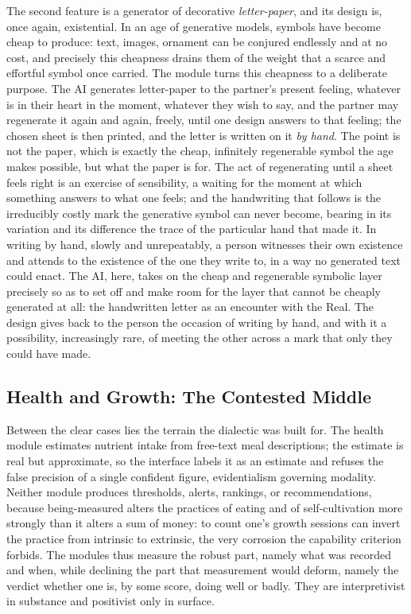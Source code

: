 \documentclass[11pt,a4paper]{article}
\begin{document}
The second feature is a generator of decorative \emph{letter-paper}, and its design is, once again, existential. In an age of generative models, symbols have become cheap to produce: text, images, ornament can be conjured endlessly and at no cost, and precisely this cheapness drains them of the weight that a scarce and effortful symbol once carried. The module turns this cheapness to a deliberate purpose. The AI generates letter-paper to the partner's present feeling, whatever is in their heart in the moment, whatever they wish to say, and the partner may regenerate it again and again, freely, until one design answers to that feeling; the chosen sheet is then printed, and the letter is written on it \emph{by hand}. The point is not the paper, which is exactly the cheap, infinitely regenerable symbol the age makes possible, but what the paper is for. The act of regenerating until a sheet feels right is an exercise of sensibility, a waiting for the moment at which something answers to what one feels; and the handwriting that follows is the irreducibly costly mark the generative symbol can never become, bearing in its variation and its difference the trace of the particular hand that made it. In writing by hand, slowly and unrepeatably, a person witnesses their own existence and attends to the existence of the one they write to, in a way no generated text could enact. The AI, here, takes on the cheap and regenerable symbolic layer precisely so as to set off and make room for the layer that cannot be cheaply generated at all: the handwritten letter as an encounter with the Real. The design gives back to the person the occasion of writing by hand, and with it a possibility, increasingly rare, of meeting the other across a mark that only they could have made.

\subsection{Health and Growth: The Contested Middle}

Between the clear cases lies the terrain the dialectic was built for. The health module estimates nutrient intake from free-text meal descriptions; the estimate is real but approximate, so the interface labels it as an estimate and refuses the false precision of a single confident figure, evidentialism governing modality. Neither module produces thresholds, alerts, rankings, or recommendations, because being-measured alters the practices of eating and of self-cultivation more strongly than it alters a sum of money: to count one's growth sessions can invert the practice from intrinsic to extrinsic, the very corrosion the capability criterion forbids. The modules thus measure the robust part, namely what was recorded and when, while declining the part that measurement would deform, namely the verdict whether one is, by some score, doing well or badly. They are interpretivist in substance and positivist only in surface.
\end{document}
